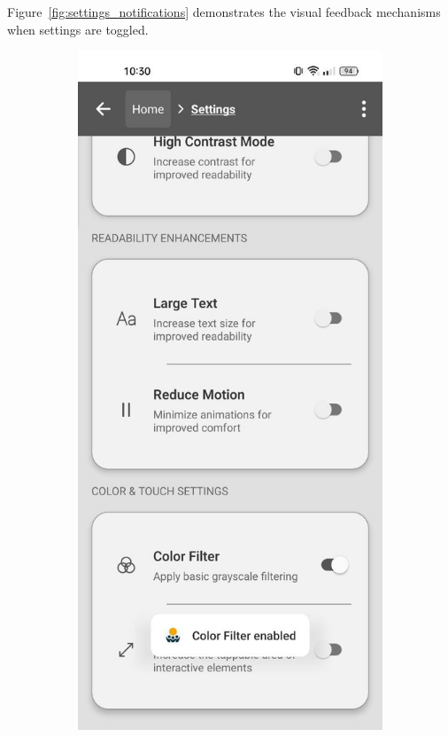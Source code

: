 \begin{enumerate}
\pagebreak

Figure~\ref{fig:settings_notifications} demonstrates the visual feedback mechanisms when settings are toggled.

\begin{figure}[ht]
    \centering
    \begin{subfigure}[b]{0.48\textwidth}
        \centering
        \includegraphics[width=\linewidth, alt={Settings screen with large text option enabled notification}]{img/settings3.jpg}

\end{subfigure}
\end{figure}
\end{enumerate}
